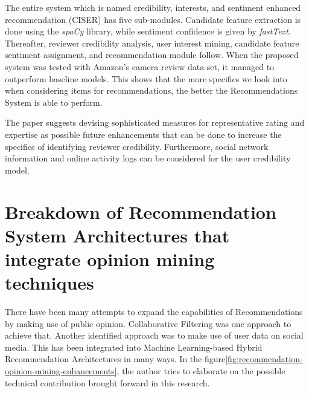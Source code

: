 \documentclass[manuscript,screen,review]{acmart}
\begin{document}
The entire system which is named credibility, interests, and sentiment enhanced recommendation (CISER) has five sub-modules. Candidate feature extraction is done using the \emph{spaCy} library, while sentiment confidence is given by \emph{fastText}. Thereafter, reviewer credibility analysis, user interest mining, candidate feature sentiment assignment, and recommendation module follow.
When the proposed system was tested with Amazon's camera review data-set, it managed to outperform baseline models. This shows that the more specifics we look into when considering items for recommendations, the better the Recommendations System is able to perform. 

The paper suggests devising sophisticated measures for representative rating and expertise as possible future enhancements that can be done to increase the specifics of identifying reviewer credibility. Furthermore, social network information and online activity logs can be considered for the user credibility model.





\section{Breakdown of Recommendation System Architectures that integrate opinion mining techniques}
There have been many attempts to expand the capabilities of Recommendations by making use of public opinion. Collaborative Filtering was one approach to achieve that. Another identified approach was to make use of user data on social media. This has been integrated into Machine Learning-based Hybrid Recommendation Architectures in many ways. In the figure\ref{fig:recommendation-opinion-mining-enhancements}, the author tries to elaborate on the possible technical contribution brought forward in this research.
\end{document}
